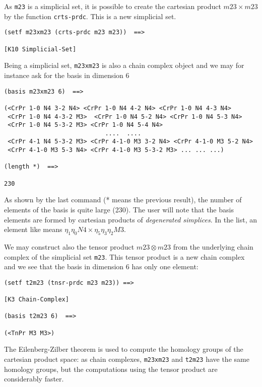 As {\tt m23} is a simplicial set, it is possible to create the cartesian product
$m23 \times m23$ by the function {\tt crts-prdc}. This is a new simplicial set.
{\footnotesize\begin{verbatim}
(setf m23xm23 (crts-prdc m23 m23))  ==>

[K10 Simplicial-Set]
\end{verbatim}}
Being a simplicial set, {\tt m23xm23} is also a chain complex object and we may for instance ask for
the basis in dimension $6$
{\footnotesize\begin{verbatim}
(basis m23xm23 6)  ==>

(<CrPr 1-0 N4 3-2 N4> <CrPr 1-0 N4 4-2 N4> <CrPr 1-0 N4 4-3 N4>
 <CrPr 1-0 N4 4-3-2 M3>  <CrPr 1-0 N4 5-2 N4> <CrPr 1-0 N4 5-3 N4>
 <CrPr 1-0 N4 5-3-2 M3> <CrPr 1-0 N4 5-4 N4>
                            ....  ....
 <CrPr 4-1 N4 5-3-2 M3> <CrPr 4-1-0 M3 3-2 N4> <CrPr 4-1-0 M3 5-2 N4>
 <CrPr 4-1-0 M3 5-3 N4> <CrPr 4-1-0 M3 5-3-2 M3> ... ... ...)

(length *)  ==>

230
\end{verbatim}}
As shown by the last command (* means the previous result),
the number of elements of the basis is quite large (230). The user
will note that the basis elements are formed by cartesian products of {\em degenerated simplices}. In
the list, an element like {\tt <CrPr 1-0 N4 5-3-2 M3>} means $\eta_1\eta_0 N4 \times \eta_5\eta_3\eta_2 M3$.
\par
We may construct also the tensor product $m23 \otimes m23$ from the underlying chain complex
of the simplicial set {\tt m23}. This tensor product is a new chain complex and we see that the
basis in dimension $6$ has only one element:
{\footnotesize\begin{verbatim}
(setf t2m23 (tnsr-prdc m23 m23)) ==>

[K3 Chain-Complex]

(basis t2m23 6)  ==>

(<TnPr M3 M3>)
\end{verbatim}}
The Eilenberg-Zilber theorem is used to compute the homology groups of the cartesian
product space: as chain complexes, {\tt m23xm23} and {\tt t2m23} have the same homology groups,
but the computations using the tensor product are considerably faster.
